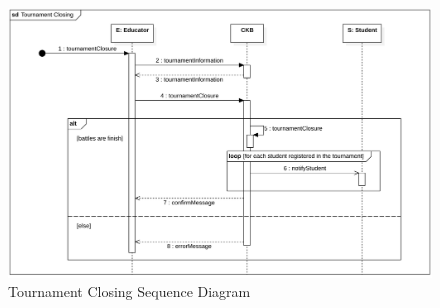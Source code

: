 \begin{figure}[h]
    \centering
    \includegraphics[scale=0.5]{images/SD/TournamentClosingSD.png} 
    \caption{Tournament Closing Sequence Diagram}
    \label{fig_TournamentClosingSD}
\end{figure}

\clearpage

